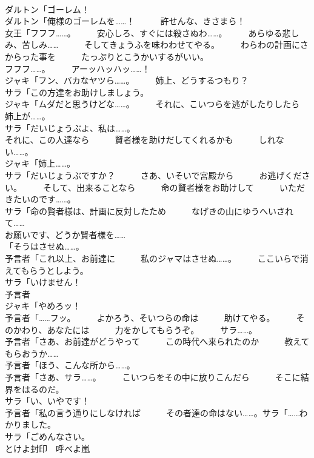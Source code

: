 \documentclass[8pt]{extreport}
\begin{document}
\begin{CJK}{UTF8}{min}
\\	ダルトン「ゴーレム！	
\\	ダルトン「俺様のゴーレムを……！　　　許せんな、きさまら！	
\\	女王「フフフ……。　　　安心しろ、すぐには殺さぬわ……。　　　あらゆる悲しみ、苦しみ……　　　そしてきょうふを味わわせてやる。　　　わらわの計画にさからった事を　　　たっぷりとこうかいするがいい。	
\\	フフフ……。　　　アーッハッハッ……！	
\\	ジャキ「フン、バカなヤツら……。　　　姉上、どうするつもり？	
\\	サラ「この方達をお助けしましょう。	
\\	ジャキ「ムダだと思うけどな……。　　　それに、こいつらを逃がしたりしたら　　　姉上が……。	
\\	サラ「だいじょうぶよ、私は……。	
\\	それに、この人達なら　　　賢者様を助けだしてくれるかも　　　しれない……。	
\\	ジャキ「姉上……。	
\\	サラ「だいじょうぶですか？　　　さあ、いそいで宮殿から　　　お逃げください。　　　そして、出来ることなら　　　命の賢者様をお助けして　　　いただきたいのです……。	
\\	サラ「命の賢者様は、計画に反対したため　　　なげきの山にゆうへいされて……	
\\	お願いです、どうか賢者様を……	
\\	「そうはさせぬ……。	
\\	予言者「これ以上、お前達に　　　私のジャマはさせぬ……。　　　ここいらで消えてもらうとしよう。	
\\	サラ「いけません！	
\\	予言者
\\	ジャキ「やめろッ！	
\\	予言者「……フッ。　　　よかろう、そいつらの命は　　　助けてやる。　　　そのかわり、あなたには　　　力をかしてもらうぞ。　　　サラ……。	
\\	予言者「さあ、お前達がどうやって　　　この時代へ来られたのか　　　教えてもらおうか……	
\\	予言者「ほう、こんな所から……。	
\\	予言者「さあ、サラ……。　　　こいつらをその中に放りこんだら　　　そこに結界をはるのだ。	
\\	サラ「い、いやです！	
\\	予言者「私の言う通りにしなければ　　　その者達の命はない……。サラ「……わかりました。	
\\	サラ「ごめんなさい。	
\\	とけよ封印　呼べよ嵐	

\end{CJK}
\end{document}
